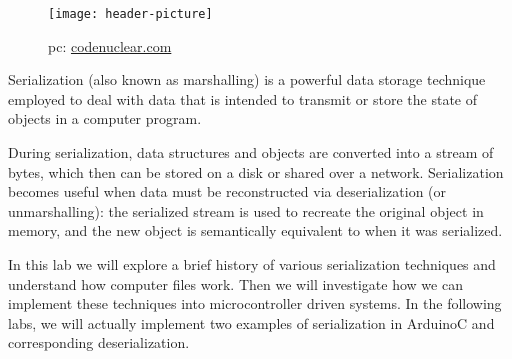 \begin{wrapfigure}{L}{0.5\textwidth}
    \begin{center}
        \texttt{[image: header-picture]}
    \end{center}
    \caption*{pc: \href{https://www.codenuclear.com/serialization-deserialization-java/}{codenuclear.com}}
\end{wrapfigure}

Serialization (also known as marshalling) is a powerful data storage technique employed to deal with data that is intended to transmit or store the state of objects in a computer program.

During serialization, data structures and objects are converted into a stream of bytes, which then can be stored on a disk or shared over a network. Serialization becomes useful when data must be reconstructed via deserialization (or unmarshalling): the serialized stream is used to recreate the original object in memory, and the new object is semantically equivalent to when it was serialized. 

In this lab we will explore a brief history of various serialization techniques and understand how computer files work. Then we will investigate how we can implement these techniques into microcontroller driven systems. In the following labs, we will actually implement two examples of serialization in ArduinoC and corresponding deserialization. 
